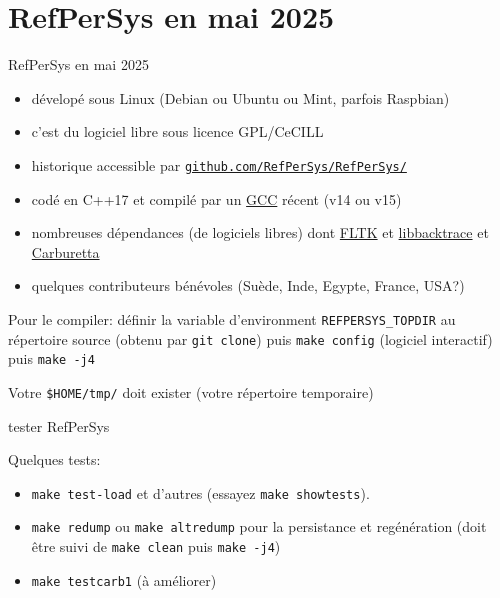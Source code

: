 \documentclass[final,a4,xcolor={svgnames,dvipsnames}]{beamer}
\begin{document}
 \section{RefPerSys en mai 2025}
 \label{sec:refpersys-mai2025}
 \begin{frame}{RefPerSys en mai 2025}
   \begin{itemize}
   \item dévelopé sous Linux (Debian ou Ubuntu ou Mint, parfois Raspbian)
   \item c'est du logiciel libre sous licence GPL/CeCILL
   \item historique accessible par \href{https://github.com/RefPerSys/RefPerSys/}{\texttt{github.com/RefPerSys/RefPerSys/}}
   \item codé en C++17 et compilé par un \href{https://gcc.gnu.org/}{GCC} récent (v14 ou v15)
   \item nombreuses dépendances (de logiciels libres) dont
       \href{https://fltk.org}{FLTK} et
       \href{https://github.com/ianlancetaylor/libbacktrace}{libbacktrace}
       et \href{https://carburetta.com/}{Carburetta}
     \item quelques contributeurs bénévoles (Suède, Inde, Egypte,
       France, USA?)
   \end{itemize}

   \bigskip
   
   Pour le compiler: définir la variable d'environment
   \texttt{REFPERSYS\_TOPDIR} au répertoire source (obtenu par
   \texttt{git clone}) puis \texttt{make config} (logiciel interactif)
   puis \texttt{make -j4}

   Votre \texttt{\$HOME/tmp/} doit exister (votre répertoire temporaire)
 \end{frame}
 \begin{frame}{tester RefPerSys}
   
   Quelques tests:

   \begin{itemize}
     \item \texttt{make test-load} et d'autres (essayez
      \texttt{make showtests}).

      \item \texttt{make redump} ou \texttt{make
     altredump} pour la persistance et regénération (doit être suivi
      de \texttt{make clean} puis \texttt{make -j4})

    \item \texttt{make testcarb1} (à améliorer)
   \end{itemize}
 \end{frame}
\end{document}
